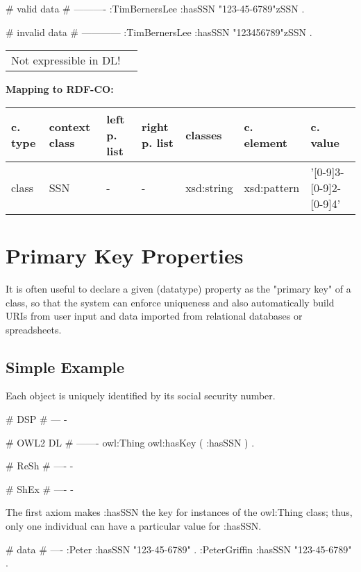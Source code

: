 \documentclass{llncs}
\newenvironment{gcotable}{
  \scriptsize
  \sffamily
  \vspace{0cm}
	\begin{center}
	\textbf{\vspace{0.4cm}Mapping to RDF-CO:} \\
  \begin{tabular}{l|l|l|l|l|l|l}
	\hline
  \textbf{c. type} & \textbf{context class} & \textbf{left p. list} & \textbf{right p. list} & \textbf{classes} & \textbf{c. element} & \textbf{c. value} \\
  \hline

}{
  \hline
  \end{tabular}
	\end{center}
}
\newenvironment{DL}{
  \vspace{0cm}
	\begin{center}
  \begin{tabular}{r l}

}{
  \end{tabular}
	\end{center}
}
\begin{document}
\begin{ex}
# valid data
# ----------
:TimBernersLee
    :hasSSN "123-45-6789"^^:SSN .
\end{ex}

\begin{ex}
# invalid data
# ------------
:TimBernersLee
    :hasSSN "123456789"^^:SSN .
\end{ex}

\begin{DL}
Not expressible in DL!
\end{DL}

\begin{gcotable}
class & SSN & - & - & xsd:string & xsd:pattern & '[0-9]{3}-[0-9]{2}-[0-9]{4}' \\
\end{gcotable}

\section{Primary Key Properties}

It is often useful to declare a given (datatype) property as the "primary key" of a class, so that the system can enforce uniqueness and also automatically build URIs from user input and data imported from relational databases or spreadsheets. 

\subsection{Simple Example}
Each object is uniquely identified by its social security number.

\begin{ex}
# DSP
# ---
-
\end{ex}

\begin{ex}
# OWL2 DL
# -------
owl:Thing owl:hasKey ( :hasSSN ) . 	
\end{ex}

\begin{ex}
# ReSh
# ----
-
\end{ex}

\begin{ex}
# ShEx
# ----
-
\end{ex}

The first axiom makes :hasSSN the key for instances of the owl:Thing class; thus, only one individual can have a particular value for :hasSSN. 

\begin{ex}
# data
# ----
:Peter :hasSSN "123-45-6789" . 
:PeterGriffin :hasSSN "123-45-6789" . 
\end{ex}
\end{document}
